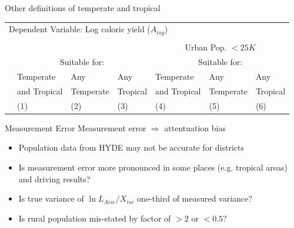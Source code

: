\documentclass[10pt, xcolor=dvipsnames]{beamer}
\begin{document}
\begin{frame}{Other definitions of temperate and tropical}\label{definition}

{\footnotesize
\begin{tabularx}{\textwidth}{lXXXXXX}
\midrule
\multicolumn{6}{l}{Dependent Variable: Log caloric yield ($A_{isg}$)} \\ \\
 &   & &                             & \multicolumn{3}{c}{Urban Pop. $<25K$} \\
 & \multicolumn{3}{c}{Suitable for:} & \multicolumn{3}{c}{Suitable for:} \\ \cmidrule(lr){2-4} \cmidrule(lr){5-7}
 & Temperate   & Any       & Any      & Temperate     & Any       & Any      \\
 & and Tropical & Temperate & Tropical & and Tropical & Temperate & Tropical \\
 & (1) & (2) & (3) & (4) & (5) & (6) \\
\midrule

\midrule
\end{tabularx}
}

\hfill \hyperlink{robustness}{}
\end{frame}




\begin{frame}{Measurement Error}\label{measure}
Measurement error $\Rightarrow$ attentuation bias
\begin{itemize}
  \item Population data from HYDE may not be accurate for districts
  \item Is measurement error more pronounced in some places (e.g. tropical areas) and driving results?
  \item Is true variance of $\ln L_{Aisc}/X_{isc}$ one-third of measured variance?
  \item Is rural population mis-stated by factor of $>2$ or $<0.5$?
\end{itemize}

\hfill \hyperlink{robustness}{}
\end{frame}
\end{document}
